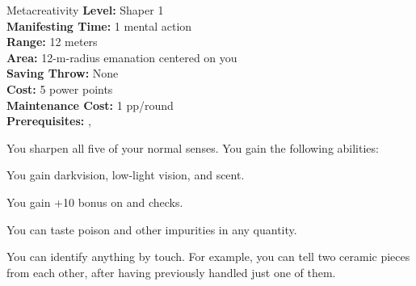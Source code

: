 {Metacreativity}
{
	\textbf{Level:}
	Shaper 1\\
	\textbf{Manifesting Time:}
	1 mental action\\
	\textbf{Range:}
	12 meters\\
	\textbf{Area:}
	12-m-radius emanation centered on you\\
	\textbf{Saving Throw:}
	None\\
	\textbf{Cost:}
	5 power points\\
	\textbf{Maintenance Cost:}
	1 pp/round\\
	\textbf{Prerequisites:}
	, \\
}
{
	You sharpen all five of your normal senses. You gain the following abilities:
	\begin{itemize*}
	\item You gain darkvision, low-light vision, and scent.
	\item You gain +10 bonus on  and  checks.
	\item You can taste poison and other impurities in any quantity.
	\item You can identify anything by touch. For example, you can tell two ceramic pieces from each other, after having previously handled just one of them. 
	\end{itemize*}
}
